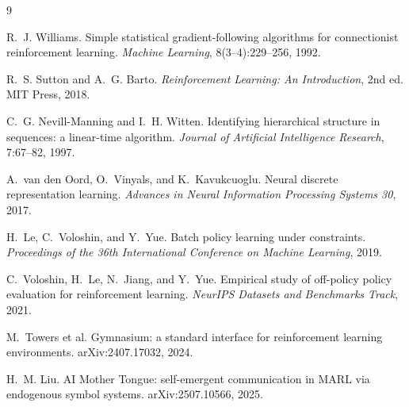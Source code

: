 \documentclass[11pt]{article}
\begin{document}

\begin{thebibliography}{9}

R.~J. Williams.
Simple statistical gradient-following algorithms for connectionist reinforcement learning.
\emph{Machine Learning}, 8(3--4):229--256, 1992.

R.~S. Sutton and A.~G. Barto.
\emph{Reinforcement Learning: An Introduction}, 2nd ed.
MIT Press, 2018.

C.~G. Nevill-Manning and I.~H. Witten.
Identifying hierarchical structure in sequences: a linear-time algorithm.
\emph{Journal of Artificial Intelligence Research}, 7:67--82, 1997.

A.~van den Oord, O.~Vinyals, and K.~Kavukcuoglu.
Neural discrete representation learning.
\emph{Advances in Neural Information Processing Systems 30}, 2017.

H.~Le, C.~Voloshin, and Y.~Yue.
Batch policy learning under constraints.
\emph{Proceedings of the 36th International Conference on Machine Learning}, 2019.

C.~Voloshin, H.~Le, N.~Jiang, and Y.~Yue.
Empirical study of off-policy policy evaluation for reinforcement learning.
\emph{NeurIPS Datasets and Benchmarks Track}, 2021.

M.~Towers et al.
Gymnasium: a standard interface for reinforcement learning environments.
arXiv:2407.17032, 2024.

H.~M. Liu.
AI Mother Tongue: self-emergent communication in MARL via endogenous symbol systems.
arXiv:2507.10566, 2025.

\end{thebibliography}
\end{document}
